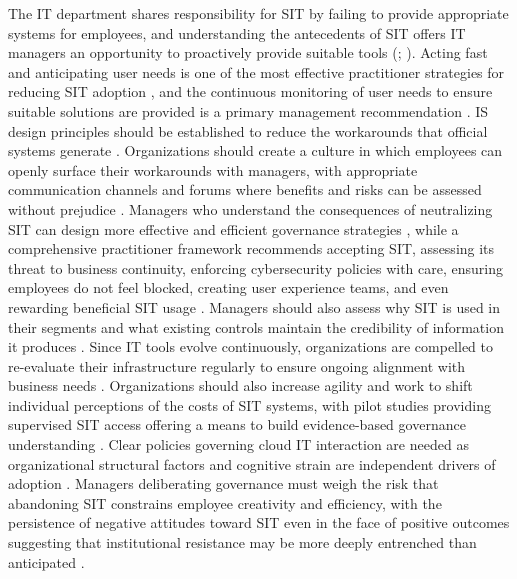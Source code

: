 \documentclass[12pt,oneside]{article}
\begin{document}
The \ac{IT} department shares responsibility for \ac{SIT} by failing to provide appropriate systems for employees, and understanding the antecedents of \ac{SIT} offers \ac{IT} managers an opportunity to proactively provide suitable tools (\citealp[26]{mallmann2018influence}; \citealp[14]{mallmann2018weare}). Acting fast and anticipating user needs is one of the most effective practitioner strategies for reducing \ac{SIT} adoption \citep[14]{kopper2019shadowit}, and the continuous monitoring of user needs to ensure suitable solutions are provided is a primary management recommendation \citep[26]{mallmann2018influence}. \ac{IS} design principles should be established to reduce the workarounds that official systems generate \citep[3]{roeder2014managers}. Organizations should create a culture in which employees can openly surface their workarounds with managers, with appropriate communication channels and forums where benefits and risks can be assessed without prejudice \citep[120]{white2023workarounds}. Managers who understand the consequences of neutralizing \ac{SIT} can design more effective and efficient governance strategies \citep[1172]{trialih2023challenge}, while a comprehensive practitioner framework recommends accepting \ac{SIT}, assessing its threat to business continuity, enforcing cybersecurity policies with care, ensuring employees do not feel blocked, creating user experience teams, and even rewarding beneficial \ac{SIT} usage \citep[409]{haag2024dealing}. Managers should also assess why \ac{SIT} is used in their segments and what existing controls maintain the credibility of information it produces \citep[106]{myers2017impact}. Since \ac{IT} tools evolve continuously, organizations are compelled to re-evaluate their infrastructure regularly to ensure ongoing alignment with business needs \citep[373]{koeffer2015innovation}. Organizations should also increase agility and work to shift individual perceptions of the costs of \ac{SIT} systems, with pilot studies providing supervised \ac{SIT} access offering a means to build evidence-based governance understanding \citep[116]{silic2019critical}. Clear policies governing cloud \ac{IT} interaction are needed as organizational structural factors and cognitive strain are independent drivers of adoption \citep[74]{ogedengbe2024influence}. Managers deliberating governance must weigh the risk that abandoning \ac{SIT} constrains employee creativity and efficiency, with the persistence of negative attitudes toward \ac{SIT} even in the face of positive outcomes suggesting that institutional resistance may be more deeply entrenched than anticipated \citep[31, 38]{allen2019shadow}.
\end{document}

